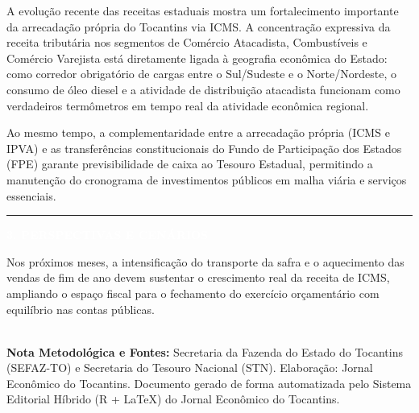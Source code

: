 \documentclass[10pt,a4paper]{article}
\newcommand{\secaojornal}[1]{%
  \vspace{6pt}%
  {\noindent\colorbox{azulto}{%
    \parbox{\dimexpr\textwidth-2\fboxsep\relax}{%
      \vspace{3pt}\hspace{4pt}\textcolor{douradoto}{\rule{7pt}{7pt}}\hspace{6pt}%
      \textcolor{white}{\textbf{\normalsize \MakeUppercase{#1}}}\vspace{3pt}%
    }%
  }}%
  \vspace{4pt}%
}
\begin{document}
A evolução recente das receitas estaduais mostra um fortalecimento importante da arrecadação própria do Tocantins via ICMS. A concentração expressiva da receita tributária nos segmentos de Comércio Atacadista, Combustíveis e Comércio Varejista está diretamente ligada à geografia econômica do Estado: como corredor obrigatório de cargas entre o Sul/Sudeste e o Norte/Nordeste, o consumo de óleo diesel e a atividade de distribuição atacadista funcionam como verdadeiros termômetros em tempo real da atividade econômica regional.

\vspace{4pt}

Ao mesmo tempo, a complementaridade entre a arrecadação própria (ICMS e IPVA) e as transferências constitucionais do Fundo de Participação dos Estados (FPE) garante previsibilidade de caixa ao Tesouro Estadual, permitindo a manutenção do cronograma de investimentos públicos em malha viária e serviços essenciais.

\secaojornal{3. Perspectivas e Cenários}

Nos próximos meses, a intensificação do transporte da safra e o aquecimento das vendas de fim de ano devem sustentar o crescimento real da receita de ICMS, ampliando o espaço fiscal para o fechamento do exercício orçamentário com equilíbrio nas contas públicas.

\vfill
\noindent{\color{borda}\rule{\textwidth}{0.5pt}}\\[-2pt]
{\scriptsize\textcolor{cinzasuave}{\textbf{Nota Metodológica e Fontes:} Secretaria da Fazenda do Estado do Tocantins (SEFAZ-TO) e Secretaria do Tesouro Nacional (STN). Elaboração: Jornal Econômico do Tocantins. Documento gerado de forma automatizada pelo Sistema Editorial Híbrido (R + LaTeX) do Jornal Econômico do Tocantins.}}
\end{document}
